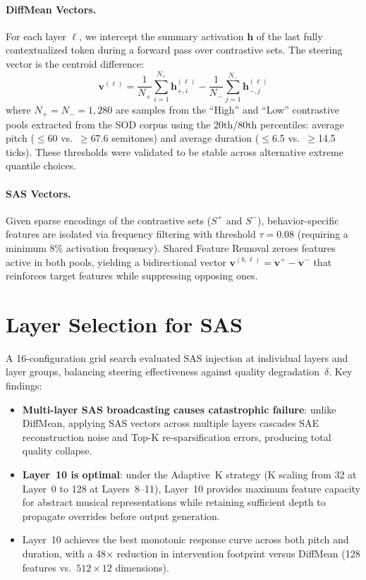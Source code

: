 \documentclass{article}
\theoremstyle{plain}
\begin{document}
\paragraph{DiffMean Vectors.}
For each layer $\ell$, we intercept the summary activation $\mathbf{h}$ of the last fully contextualized token during a forward pass over contrastive sets. The steering vector is the centroid difference:
\begin{equation}
    \mathbf{v}^{(\ell)} = \frac{1}{N_+}\sum_{i=1}^{N_+}\mathbf{h}^{(\ell)}_{+,i} - \frac{1}{N_-}\sum_{j=1}^{N_-}\mathbf{h}^{(\ell)}_{-,j}
\end{equation}
where $N_+ = N_- = 1{,}280$ are samples from the ``High'' and ``Low'' contrastive pools extracted from the SOD corpus using the 20th/80th percentiles: average pitch ($\leq$60 vs.\ $\geq$67.6 semitones) and average duration ($\leq$6.5 vs.\ $\geq$14.5 ticks). These thresholds were validated to be stable across alternative extreme quantile choices.

\paragraph{SAS Vectors.}
Given sparse encodings of the contrastive sets ($S^+$ and $S^-$), behavior-specific features are isolated via frequency filtering with threshold $\tau{=}0.08$ (requiring a minimum 8\% activation frequency). Shared Feature Removal zeroes features active in both pools, yielding a bidirectional vector $\mathbf{v}^{(b,\ell)} = \mathbf{v}^{+} - \mathbf{v}^{-}$ that reinforces target features while suppressing opposing ones.

\section{Layer Selection for SAS}
\label{app:layer_selection}

A 16-configuration grid search evaluated SAS injection at individual layers and layer groups, balancing steering effectiveness against quality degradation~$\delta$. Key findings:

\begin{itemize}
    \item \textbf{Multi-layer SAS broadcasting causes catastrophic failure}: unlike DiffMean, applying SAS vectors across multiple layers cascades SAE reconstruction noise and Top-K re-sparsification errors, producing total quality collapse.
    \item \textbf{Layer~10 is optimal}: under the Adaptive~K strategy (K scaling from 32 at Layer~0 to 128 at Layers~8--11), Layer~10 provides maximum feature capacity for abstract musical representations while retaining sufficient depth to propagate overrides before output generation.
    \item Layer~10 achieves the best monotonic response curve across both pitch and duration, with a 48$\times$ reduction in intervention footprint versus DiffMean (128 features vs.\ $512{\times}12$ dimensions).
\end{itemize}
\end{document}
